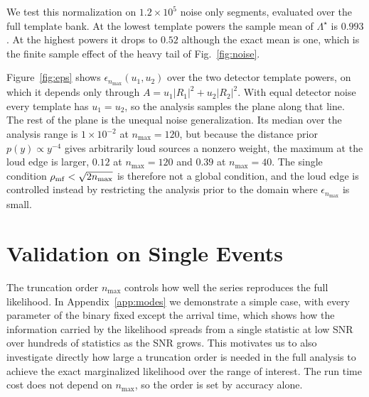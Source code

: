 \documentclass[aps,prd,twocolumn,superscriptaddress,nofootinbib]{revtex4-2}
\begin{document}
We test this normalization on $1.2 \times 10^5$ noise only
segments, evaluated over the full template bank. At the lowest
template powers the sample mean of $\Lambda^\star$ is $0.993$. At
the highest powers it drops to $0.52$ although the exact mean is
one, which is the finite sample effect of the heavy tail of
Fig.~\ref{fig:noise}.

Figure~\ref{fig:eps} shows $\epsilon_{n_{\max}}(u_1, u_2)$ over the two
detector template powers, on which it depends only through
$A = u_1 |R_1|^2 + u_2 |R_2|^2$. With equal detector noise every
template has $u_1 = u_2$, so the analysis samples the plane along that
line. The rest of the plane is the unequal noise generalization. Its
median over the analysis range is $1 \times 10^{-2}$ at
$n_{\max} = 120$, but because the distance prior
$p(y) \propto y^{-4}$ gives arbitrarily loud sources a nonzero weight,
the maximum at the loud edge is larger, $0.12$ at $n_{\max} = 120$ and
$0.39$ at $n_{\max} = 40$.
The single condition $\rho_{\rm mf} < \sqrt{2 n_{\max}}$ is therefore not
a global condition, and the loud edge is controlled instead by
restricting the analysis prior to the domain where $\epsilon_{n_{\max}}$
is small.

\section{Validation on Single Events}
\label{sec:validation}

The truncation order $n_{\max}$ controls how well the series reproduces the full likelihood. In Appendix~\ref{app:modes} we demonstrate a simple case, with every parameter of the binary fixed except the arrival time, which shows how the information carried by the likelihood spreads from a single statistic at low SNR over hundreds of statistics as the SNR grows. This motivates us to also investigate directly how large a truncation order is needed in the full analysis to achieve the exact marginalized likelihood over the range of interest. The run time cost does not depend on $n_{\max}$, so the order is set by accuracy alone.
\end{document}
